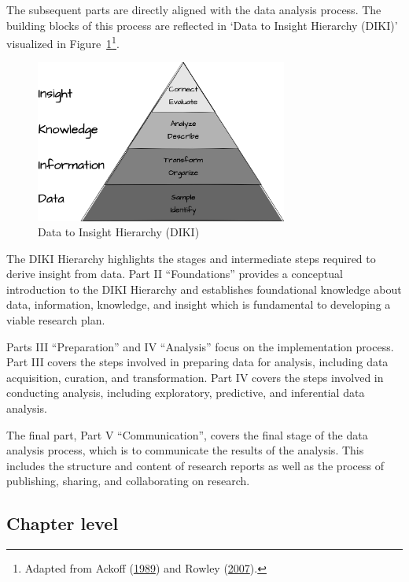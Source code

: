 \documentclass[
  letterpaper,
  DIV=11,
  numbers=noendperiod]{scrreport}
\theoremstyle{definition}
\theoremstyle{remark}
\begin{document}
The subsequent parts are directly aligned with the data analysis
process. The building blocks of this process are reflected in `Data to
Insight Hierarchy (DIKI)' visualized in
Figure~\ref{fig-diki-hierarchy}\footnote{Adapted from Ackoff
  (\protect\hyperlink{ref-Ackoff1989}{1989}) and Rowley
  (\protect\hyperlink{ref-Rowley2007}{2007}).}.

\begin{figure}[H]

{\centering \includegraphics[width=3.26in,height=\textheight]{figures/p-diki.drawio.png}

}

\caption{\label{fig-diki-hierarchy}Data to Insight Hierarchy (DIKI)}

\end{figure}

The DIKI Hierarchy highlights the stages and intermediate steps required
to derive insight from data. Part II ``Foundations'' provides a
conceptual introduction to the DIKI Hierarchy and establishes
foundational knowledge about data, information, knowledge, and insight
which is fundamental to developing a viable research plan.

Parts III ``Preparation'' and IV ``Analysis'' focus on the
implementation process. Part III covers the steps involved in preparing
data for analysis, including data acquisition, curation, and
transformation. Part IV covers the steps involved in conducting
analysis, including exploratory, predictive, and inferential data
analysis.

The final part, Part V ``Communication'', covers the final stage of the
data analysis process, which is to communicate the results of the
analysis. This includes the structure and content of research reports as
well as the process of publishing, sharing, and collaborating on
research.

\hypertarget{sec-p-structure-chapter}{%
\subsection*{Chapter level}\label{sec-p-structure-chapter}}
\end{document}
